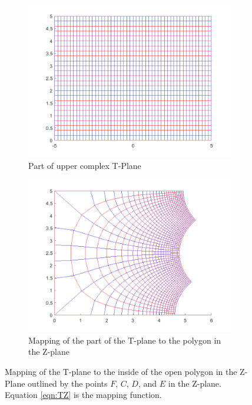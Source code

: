     \begin{figure}[h]
    \centering
    \begin{subfigure}[t]{0.45\textwidth}
        \centering
        \includegraphics[width=\textwidth]{images/TtoZ_strip.png}
        \caption{Part of upper complex T-Plane}
    \end{subfigure}
    \hfill
    \begin{subfigure}[t]{0.45\textwidth}
        \centering
        \includegraphics[width=\textwidth]{images/TtoZ_map.png}
        \caption{Mapping of the part of the T-plane to the polygon in the Z-plane}
    \end{subfigure} 
    \caption[Mapping of the T-plane to the inside of the open polygon in the Z-Plane]{Mapping of the T-plane to the inside of the open polygon in the Z-Plane outlined by the points $F$, $C$, $D$, and $E$ in the Z-plane. Equation \ref{eqn:TZ} is the mapping function.} 
    \label{fig:T_to_Z_mapping}
 \end{figure}
 
